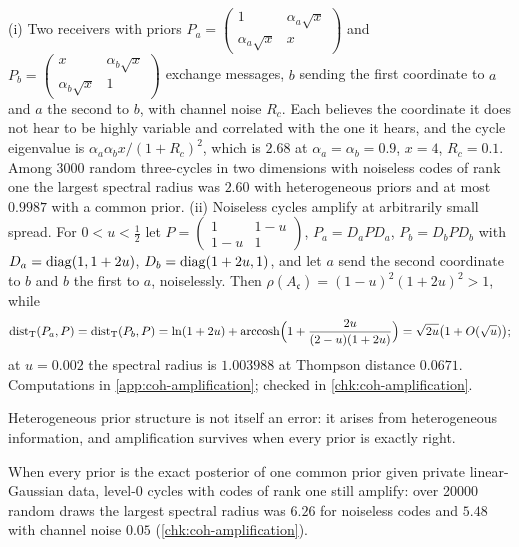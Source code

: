 \begin{example}\label{ex:coh-amplification}
(i) Two receivers with priors $P_a=\begin{pmatrix}1&\alpha_a\sqrt x\\\alpha_a\sqrt x&x\end{pmatrix}$ and $P_b=\begin{pmatrix}x&\alpha_b\sqrt x\\\alpha_b\sqrt x&1\end{pmatrix}$ exchange messages, $b$ sending the first coordinate to $a$ and $a$ the second to $b$, with channel noise $R_c$. Each believes the coordinate it does not hear to be highly variable and correlated with the one it hears, and the cycle eigenvalue is $\alpha_a\alpha_bx/(1+R_c)^2$, which is $2.68$ at $\alpha_a=\alpha_b=0.9$, $x=4$, $R_c=0.1$. Among 3000 random three-cycles in two dimensions with noiseless codes of rank one the largest spectral radius was $2.60$ with heterogeneous priors and at most $0.9987$ with a common prior.
(ii) Noiseless cycles amplify at arbitrarily small spread. For $0<u<\frac12$ let $P=\begin{pmatrix}1&1-u\\1-u&1\end{pmatrix}$, $P_a=D_aPD_a$, $P_b=D_bPD_b$ with $D_a=\operatorname{diag}(1,1+2u)$, $D_b=\operatorname{diag}(1+2u,1)$, and let $a$ send the second coordinate to $b$ and $b$ the first to $a$, noiselessly. Then $\rho(A_{\mathfrak c})=(1-u)^2(1+2u)^2>1$, while
\[ \operatorname{dist}_{\mathrm T}(P_a,P)=\operatorname{dist}_{\mathrm T}(P_b,P)=\ln(1+2u)+\operatorname{arccosh}\Bigl(1+\frac{2u}{(2-u)(1+2u)}\Bigr)=\sqrt{2u}\bigl(1+O(\sqrt u)\bigr); \]
at $u=0.002$ the spectral radius is $1.003988$ at Thompson distance $0.0671$. Computations in \cref{app:coh-amplification}; checked in \cref{chk:coh-amplification}.
\end{example}

Heterogeneous prior structure is not itself an error: it arises from heterogeneous information, and amplification survives when every prior is exactly right.

\begin{observation}\label{obs:coh-amplification-information}
When every prior is the exact posterior of one common prior given private linear-Gaussian data, level-0 cycles with codes of rank one still amplify: over 20000 random draws the largest spectral radius was $6.26$ for noiseless codes and $5.48$ with channel noise $0.05$ (\cref{chk:coh-amplification}).
\end{observation}

